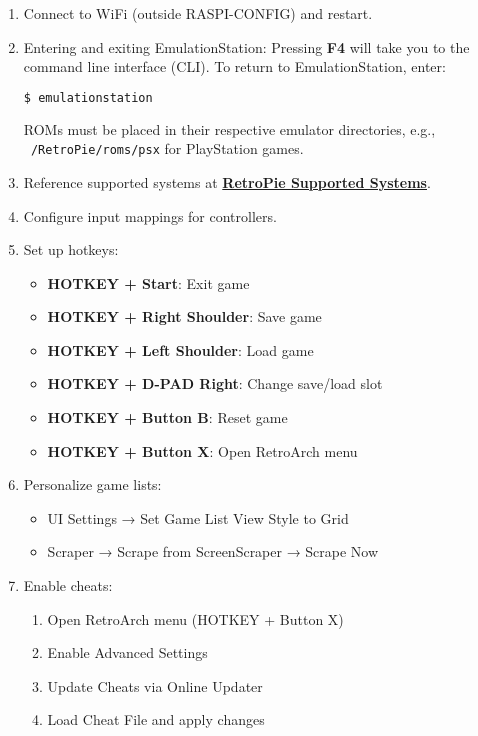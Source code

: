 \documentclass[a4paper,12pt]{article}
\begin{document}
\begin{enumerate}
    \item Connect to WiFi (outside RASPI-CONFIG) and restart.

    \item Entering and exiting EmulationStation:
    Pressing \textbf{F4} will take you to the command line interface (CLI). To return to EmulationStation, enter:
    \begin{lstlisting}[language=bash, breaklines=true, breakatwhitespace=true, columns=fullflexible]
    $ emulationstation
    \end{lstlisting}
    ROMs must be placed in their respective emulator directories, e.g., \texttt{~/RetroPie/roms/psx} for PlayStation games.
    
    \item Reference supported systems at \href{https://retropie.org.uk/docs/Supported-Systems/}{\textbf{\color{blue}RetroPie Supported Systems}}.
    
    \item Configure input mappings for controllers.
    
    \item Set up hotkeys:
    \begin{itemize}
        \item \textbf{HOTKEY + Start}: Exit game
        \item \textbf{HOTKEY + Right Shoulder}: Save game
        \item \textbf{HOTKEY + Left Shoulder}: Load game
        \item \textbf{HOTKEY + D-PAD Right}: Change save/load slot
        \item \textbf{HOTKEY + Button B}: Reset game
        \item \textbf{HOTKEY + Button X}: Open RetroArch menu
    \end{itemize}
    
    \item Personalize game lists:
    \begin{itemize}
        \item UI Settings → Set Game List View Style to Grid
        \item Scraper → Scrape from ScreenScraper → Scrape Now
    \end{itemize}
    
    \item Enable cheats:
    \begin{enumerate}
        \item Open RetroArch menu (HOTKEY + Button X)
        \item Enable Advanced Settings
        \item Update Cheats via Online Updater
        \item Load Cheat File and apply changes
    \end{enumerate}


\end{enumerate}
\end{document}
